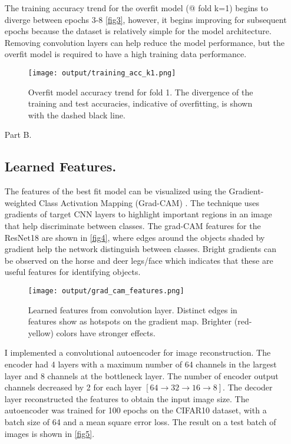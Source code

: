 \documentclass[12pt]{report}
\begin{document}
\begin{enumerate}
    The training accuracy trend for the overfit model (@ fold k=1) begins to diverge between epochs 3-8 \autoref{fig3}, however, it begins improving for subsequent epochs because 
    the dataset is relatively simple for the model architecture. Removing convolution layers can help reduce the model performance, but the overfit model is required to have a high 
    training data performance.

    \begin{figure}[H]
        \centering
        \texttt{[image: output/training\_acc\_k1.png]}
        \caption{Overfit model accuracy trend for fold 1. The divergence of the training and test accuracies, indicative of overfitting, is shown with the dashed black line.}
        \label{fig3}
    \end{figure}

    \item[Part B.]
    \subsection*{Learned Features.}
    The features of the best fit model can be visualized using the Gradient-weighted Class Activation Mapping (Grad-CAM) \cite{Selvaraju_2019}. The technique uses gradients of 
    target CNN layers to highlight important regions in an image that help discriminate between classes. The grad-CAM features for the ResNet18 are shown in \autoref{fig4}, where 
    edges around the objects shaded by gradient help the network distinguish between classes. Bright gradients can be observed on the horse and deer legs/face which indicates that 
    these are useful features for identifying objects.

    \begin{figure}[H]
        \centering
        \texttt{[image: output/grad\_cam\_features.png]}
        \caption{Learned features from convolution layer. Distinct edges in features show as hotspots on the gradient map. Brighter (red-yellow) colors have stronger effects.}
        \label{fig4}
    \end{figure}

    I implemented a convolutional autoencoder for image reconstruction. The encoder had 4 layers with a maximum number of 64 channels in the largest layer and 8 channels at the 
    bottleneck layer. The number of encoder output channels decreased by 2 for each layer $[64 \rightarrow 32 \rightarrow 16 \rightarrow 8]$. The decoder layer reconstructed the 
    features to obtain the input image size. The autoencoder was trained for 100 epochs on the CIFAR10 dataset, with a batch size of 64 and a mean square error loss. The result on 
    a test batch of images is shown in \autoref{fig5}.


\end{enumerate}
\end{document}
